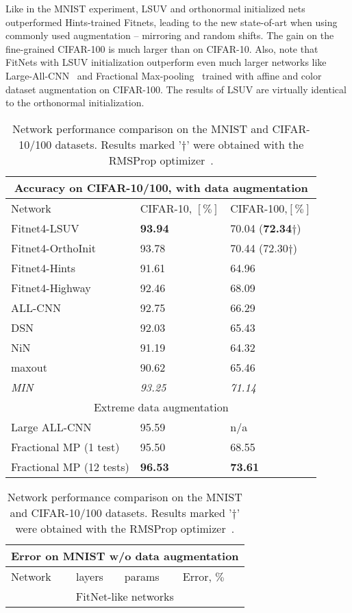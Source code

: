 \documentclass{article} \clearpage{}\usepackage{iclr2016_conference,times}
\begin{document}
Like in the MNIST experiment, LSUV and orthonormal initialized nets outperformed Hints-trained Fitnets, leading to the new state-of-art when using commonly used augmentation -- mirroring and random shifts. The gain on the fine-grained CIFAR-100 is much larger than on CIFAR-10. Also, note that FitNets with LSUV initialization outperform even much larger networks like Large-All-CNN~\cite{ALLCNN2015} and Fractional Max-pooling~\cite{FractMaxPool2014} trained with affine and color dataset augmentation on CIFAR-100. 
The results of LSUV are virtually identical to the orthonormal initialization. 
\begin{table}[htb]
\caption{Network performance comparison on the MNIST and CIFAR-10/100 datasets. Results marked '$\dagger$' were obtained with the RMSProp optimizer~\cite{Tieleman2012}.}
\label{tab:CIFAR-MNIST}
\footnotesize
\centering
\setlength{\tabcolsep}{.3em}
\begin{tabular}{lll}
\multicolumn{3}{c}{Accuracy on CIFAR-10/100, with data augmentation}\\
\hline
Network &CIFAR-10, $[\%]$ & CIFAR-100,$[\%]$ \\
\hline
Fitnet4-LSUV & \textbf{93.94} & 70.04 (\textbf{72.34}$\dagger$) \\
Fitnet4-OrthoInit & 93.78          & 70.44 (72.30$\dagger$) \\
Fitnet4-Hints     & 91.61          & 64.96 \\
Fitnet4-Highway   & 92.46          & 68.09 \\
\hline
ALL-CNN &  92.75 & 66.29\\
DSN &  92.03 & 65.43\\
NiN &  91.19 & 64.32\\
maxout &  90.62 & 65.46\\
\textit{MIN} & \textit{93.25}& \textit{71.14} \\
\hline
\multicolumn{3}{c}{Extreme data augmentation}\\
\hline
Large ALL-CNN& 95.59 & n/a\\
Fractional MP (1 test) & 95.50 & 68.55 \\
Fractional MP (12 tests)& \textbf{96.53} & \textbf{73.61}\\
\hline
\end{tabular}
\begin{tabular}{llll}
\multicolumn{4}{c}{Error on MNIST w/o data augmentation}\\
\hline
Network &  layers &  params & Error, $\%$\\
\hline
\multicolumn{4}{c}{FitNet-like networks}\\

\end{tabular}
\end{table}
\end{document}

